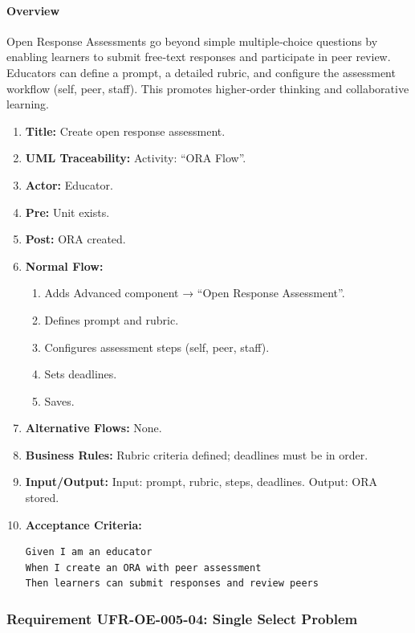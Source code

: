 \paragraph{Overview}
Open Response Assessments go beyond simple multiple‑choice questions by enabling learners to submit free‑text responses and participate in peer review. Educators can define a prompt, a detailed rubric, and configure the assessment workflow (self, peer, staff). This promotes higher‑order thinking and collaborative learning.
\begin{enumerate}[label=\textbf{\arabic*.}]
\item \textbf{Title:} Create open response assessment.
\item \textbf{UML Traceability:} Activity: “ORA Flow”.
\item \textbf{Actor:} Educator.
\item \textbf{Pre:} Unit exists.
\item \textbf{Post:} ORA created.
\item \textbf{Normal Flow:} 
    \begin{enumerate}
        \item Adds Advanced component → “Open Response Assessment”.
        \item Defines prompt and rubric.
        \item Configures assessment steps (self, peer, staff).
        \item Sets deadlines.
        \item Saves.
    \end{enumerate}
\item \textbf{Alternative Flows:} None.
\item \textbf{Business Rules:} Rubric criteria defined; deadlines must be in order.
\item \textbf{Input/Output:} Input: prompt, rubric, steps, deadlines. Output: ORA stored.
\item \textbf{Acceptance Criteria:}
    \begin{verbatim}
Given I am an educator
When I create an ORA with peer assessment
Then learners can submit responses and review peers
    \end{verbatim}
\end{enumerate}

\subsubsection{Requirement UFR-OE-005-04: Single Select Problem}
